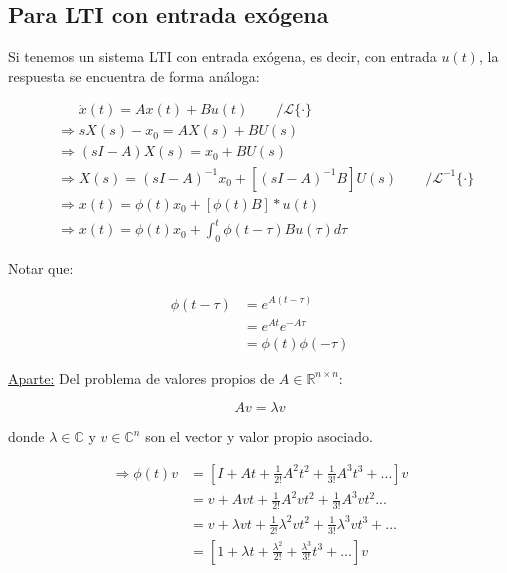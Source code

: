 \subsection{Para LTI con entrada exógena}
Si tenemos un sistema LTI con entrada exógena, es decir, con entrada $u(t)$, la respuesta se encuentra de forma análoga:

\begin{subequations}
\begin{align}
    &\phantom{\Longrightarrow}  {\dot{x}}(t) =  {A} {x}(t)+ {B} {u}(t) \qquad /\mathcal{L}\{\cdot\}\\
    &\Longrightarrow s {X}(s)- {x_0} =  {A} {X}(s)+ {B} {U}(s)\\
    &\Longrightarrow (s {I}- {A}) {X}(s) =  {x_0}+ {B} {U}(s)\\
    &\Longrightarrow  {X}(s) = (s {I}- {A})^{-1}  {x_0} + \left[(s {I}- {A})^{-1}  {B} \right]{U}(s) \qquad /\mathcal{L}^{-1}\{\cdot\}\\
    &\Longrightarrow  {x}(t) =  {\phi}(t) {x_0}+\left[  {\phi}(t) {B} \right] \ast u(t)\\
    &\Longrightarrow  {x}(t) =  {\phi}(t) {x_0}+\int_0^t {\phi}(t-\tau) {B} {u}(\tau)d\tau
\end{align}
\end{subequations}

Notar que:

\begin{align*}
    {\phi}(t-\tau)&=e^{{A}(t-\tau)}\\
    &=e^{{A}t} e^{-{A}\tau}\\ 
    &={\phi}(t){\phi}(-\tau)
\end{align*} 

\noindent \underline{Aparte:} Del problema de valores propios de $A \in \mathbb{R}^{n \times n}$:

$${A}{v}=\lambda{v}$$

donde $\lambda \in \mathbb{C}$ y $v \in \mathbb{C}^n$ son el vector y valor propio asociado.

\begin{subequations}
\begin{align}
    \Longrightarrow {\phi}(t){v} &= \left[{I}+{A}t+\frac{1}{2!}{A}^2t^2+\frac{1}{3!}{A}^3t^3+...\right]{v}\\
    &= {v}+{A}{v}t+\frac{1}{2!}{A}^2{v}t^2+\frac{1}{3!}{A}^3vt^2... \\
    &= {v}+\lambda{v}t+\frac{1}{2!}\lambda^2{v}t^2 + \frac{1}{3!}\lambda^3vt^3 +... \\
    &= \left[ 1+\lambda t+\frac{\lambda^2}{2!}+\frac{\lambda^3}{3!}t^3  + ...\right]{v}
\end{align}
\end{subequations}

